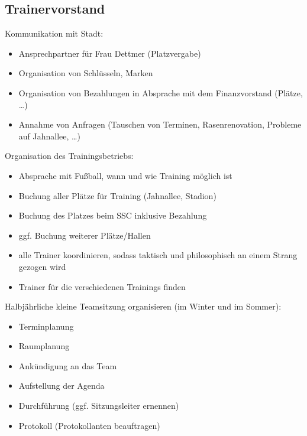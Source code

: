 \documentclass[a4 paper, 11pt]{article}
\begin{document}
\subsection{Trainervorstand}
Kommunikation mit Stadt:
\begin{itemize}
	\item Ansprechpartner für Frau Dettmer (Platzvergabe)
	\item Organisation von Schlüsseln, Marken
	\item Organisation von Bezahlungen in Absprache mit dem Finanzvorstand (Plätze, \dots)
	\item Annahme von Anfragen (Tauschen von Terminen, Rasenrenovation, Probleme auf
	Jahnallee, \dots)
\end{itemize}
\vspace{0.3cm}
Organisation des Trainingsbetriebs:
\begin{itemize}
	\item Absprache mit Fußball, wann und wie Training möglich ist
	\item Buchung aller Plätze für Training (Jahnallee, Stadion)
	\item Buchung des Platzes beim SSC inklusive Bezahlung
	\item ggf. Buchung weiterer Plätze/Hallen
	\item alle Trainer koordinieren, sodass taktisch und philosophisch an einem Strang
	gezogen wird
	\item Trainer für die verschiedenen Trainings finden
\end{itemize}
\vspace{0.3cm}
Halbjährliche kleine Teamsitzung organisieren (im Winter und im Sommer):
\begin{itemize}
	\item Terminplanung
	\item Raumplanung
	\item Ankündigung an das Team
	\item Aufstellung der Agenda
	\item Durchführung (ggf. Sitzungsleiter ernennen)
	\item Protokoll (Protokollanten beauftragen)
\end{itemize}
\end{document}

